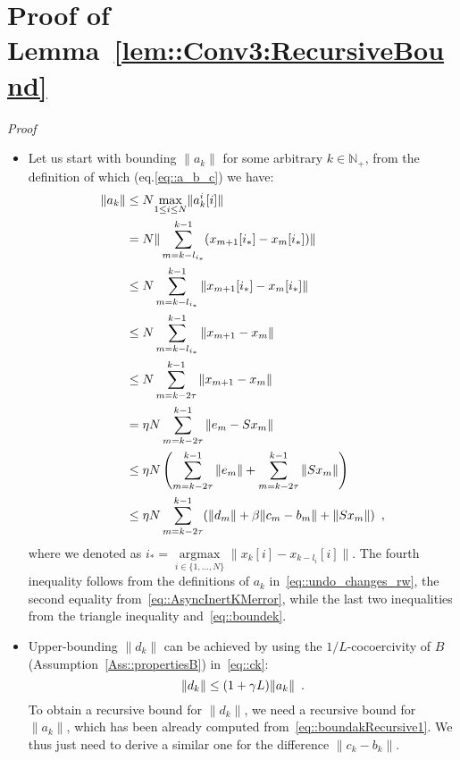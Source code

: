 \documentclass[envcountsect]{svjour3}
\newcommand{\argmax}{\operatorname{ argmax}}
\newcommand{\N}{{\mathbb{N} }}
\begin{document}
\section{Proof of Lemma~\ref{lem::Conv3:RecursiveBound} }{\label{app::Conv3:RecursiveBound}}
{\it Proof}
\begin{itemize}
  \item Let us start with bounding $\|a_k\|$ for some arbitrary $k\in\N_{+}$, from the definition of which (eq.\eqref{eq::a_b_c}) we have:
\begin{align}{\label{eq::boundakRecursive1}}
 \|a_k\| \nonumber &\leq N\underset{1\leq i\leq N}{\max}\|a_k^i[i]\|\\\nonumber
                   &= N\|\sum_{m=k-l_{i_\ast}}^{k-1}(x_{m+1}[i_\ast]-x_m[i_\ast])\|\\\nonumber
                   &\leq N\sum_{m=k-l_{i_\ast}}^{k-1}\|x_{m+1}[i_\ast]-x_m[i_\ast]\|\\\nonumber
                   &\leq N\sum_{m=k-l_{i_\ast}}^{k-1}\|x_{m+1}-x_m\|\\\nonumber
                   &\leq N\sum_{m=k-2\tau}^{k-1}\|x_{m+1}-x_m\|\\\nonumber
                   &= \eta N\sum_{m=k-2\tau}^{k-1}\|e_m-Sx_m\|\\\nonumber
                   &\leq \eta N\left(\sum_{m=k-2\tau}^{k-1}\|e_m\|+\sum_{m=k-2\tau}^{k-1}\|Sx_m\|\right)\\
                   &\leq \eta N\sum_{m=k-2\tau}^{k-1}(\|d_m\| + \beta\|c_m-b_m\| + \|Sx_m\|)\enspace,
\end{align}
where we denoted as $i_\ast=\underset{i\in\{1,\ldots,N\}}{\argmax}\|x_k[i]-x_{k-l_i}[i]\|$. The fourth inequality follows from the definitions of $a_k$ in~\eqref{eq::undo_changes_rw}, the second equality from~\eqref{eq::AsyncInertKMerror}, while the last two inequalities from the triangle inequality and~\eqref{eq::boundek}.

 \item Upper-bounding $\|d_k\|$ can be achieved by using the $1/L$-cocoercivity of $B$ (Assumption~\ref{Ass::propertiesB}) in~\eqref{eq::ck}:
\begin{equation}{\label{eq::boundcdtemp}}
 \|d_k\|\leq (1+\gamma L)\|a_k\|\enspace.
\end{equation}
To obtain a recursive bound for $\|d_k\|$, we need a recursive bound for $\|a_k\|$, which has been already computed from~\eqref{eq::boundakRecursive1}. We thus just need to derive a similar one for the difference $\|c_k-b_k\|$.


\end{itemize}
\end{document}
